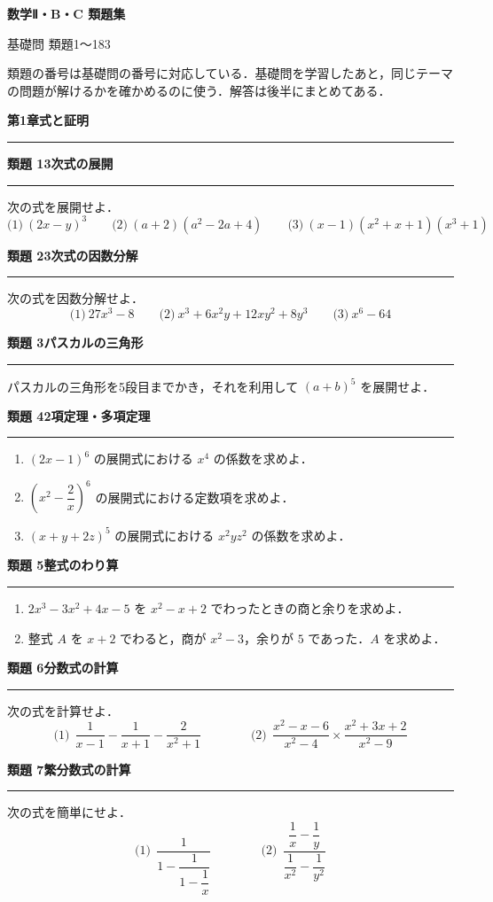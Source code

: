 \documentclass[a4paper,11pt]{ltjsarticle}
\newcommand{\mon}[2]{\Needspace{7\baselineskip}\vspace{10pt}%
  {\sffamily\bfseries 類題 #1\quad #2\par}\vspace{2pt}\hrule\vspace{4pt}}
\newcommand{\shou}[2]{\clearpage\markboth{#1\quad #2}{}%
  {\sffamily\bfseries\LARGE #1\quad #2\par}\vspace{2pt}\hrule height 1.2pt\vspace{4pt}}
\begin{document}
\thispagestyle{empty}
\begin{center}
\vspace*{50mm}
{\sffamily\bfseries\Huge 数学Ⅱ・B・C 類題集\par}
\vspace{8mm}
{\sffamily\Large 基礎問 類題1〜183\par}
\vspace{15mm}
\begin{minipage}{0.75\linewidth}\small
類題の番号は基礎問の番号に対応している．基礎問を学習したあと，同じテーマの問題が解けるかを確かめるのに使う．解答は後半にまとめてある．
\end{minipage}
\end{center}
\clearpage
\setcounter{page}{1}
\shou{第1章}{式と証明}
\mon{1}{3次式の展開}
次の式を展開せよ．
\[\text{(1)}\ (2x-y)^3\qquad\text{(2)}\ (a+2)(a^2-2a+4)\qquad\text{(3)}\ (x-1)(x^2+x+1)(x^3+1)\]

\mon{2}{3次式の因数分解}
次の式を因数分解せよ．
\[\text{(1)}\ 27x^3-8\qquad\text{(2)}\ x^3+6x^2y+12xy^2+8y^3\qquad\text{(3)}\ x^6-64\]

\mon{3}{パスカルの三角形}
パスカルの三角形を5段目までかき，それを利用して $(a+b)^5$ を展開せよ．

\mon{4}{2項定理・多項定理}
\begin{enumerate}
\item $(2x-1)^6$ の展開式における $x^4$ の係数を求めよ．
\item $\left(x^2-\dfrac2x\right)^6$ の展開式における定数項を求めよ．
\item $(x+y+2z)^5$ の展開式における $x^2yz^2$ の係数を求めよ．
\end{enumerate}

\mon{5}{整式のわり算}
\begin{enumerate}
\item $2x^3-3x^2+4x-5$ を $x^2-x+2$ でわったときの商と余りを求めよ．
\item 整式 $A$ を $x+2$ でわると，商が $x^2-3$，余りが $5$ であった．$A$ を求めよ．
\end{enumerate}

\mon{6}{分数式の計算}
次の式を計算せよ．
\[\text{(1)}\ \ \frac1{x-1}-\frac1{x+1}-\frac2{x^2+1}\qquad\qquad\text{(2)}\ \ \frac{x^2-x-6}{x^2-4}\times\frac{x^2+3x+2}{x^2-9}\]

\mon{7}{繁分数式の計算}
次の式を簡単にせよ．
\[\text{(1)}\ \ \frac{1}{1-\dfrac{1}{1-\dfrac1x}}\qquad\qquad\text{(2)}\ \ \frac{\dfrac1x-\dfrac1y}{\dfrac1{x^2}-\dfrac1{y^2}}\]
\end{document}
